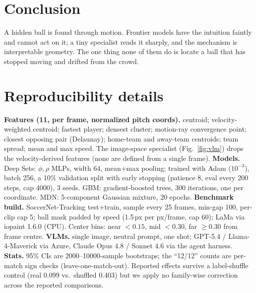 \section{Conclusion}
A hidden ball is found through motion. Frontier models have the intuition faintly and
cannot act on it; a tiny specialist reads it sharply, and the mechanism is interpretable
geometry. The one thing none of them do is locate a ball that has stopped moving and
drifted from the crowd.

\appendix
\section{Reproducibility details}
\textbf{Features (11, per frame, normalized pitch coords).} centroid; velocity-weighted
centroid; fastest player; densest cluster; motion-ray convergence point; closest opposing
pair (Delaunay); home-team and away-team centroids; team spread; mean and max speed. The
image-space specialist (Fig.~\ref{fig:vlm}) drops the velocity-derived features (none are
defined from a single frame). \textbf{Models.} Deep Sets: $\phi,\rho$ MLPs, width 64,
mean+max pooling; trained with Adam ($10^{-3}$), batch 256, a 10\% validation split with
early stopping (patience 8, eval every 200 steps, cap 4000), 3 seeds. GBM:
gradient-boosted trees, 300 iterations, one per coordinate. MDN: 5-component Gaussian
mixture, 20 epochs. \textbf{Benchmark build.} SoccerNet-Tracking test+train, sample every
25 frames, min-gap 100, per-clip cap 5; ball mask padded by speed (1.5\,px per px/frame,
cap 60); LaMa via iopaint 1.6.0 (CPU). Center bins: near $<0.15$, mid $<0.30$, far
$\ge0.30$ from frame centre. \textbf{VLMs.} single image, neutral prompt, one shot;
GPT-5.4 / Llama-4-Maverick via Azure, Claude Opus 4.8 / Sonnet 4.6 via the agent harness.
\textbf{Stats.} 95\% CIs are 2000--10000-sample bootstraps; the ``12/12'' counts are per-match
sign checks (leave-one-match-out). Reported effects survive a label-shuffle control (real
0.099 vs.\ shuffled 0.403) but we apply no family-wise correction across the reported
comparisons.

{\small  }
